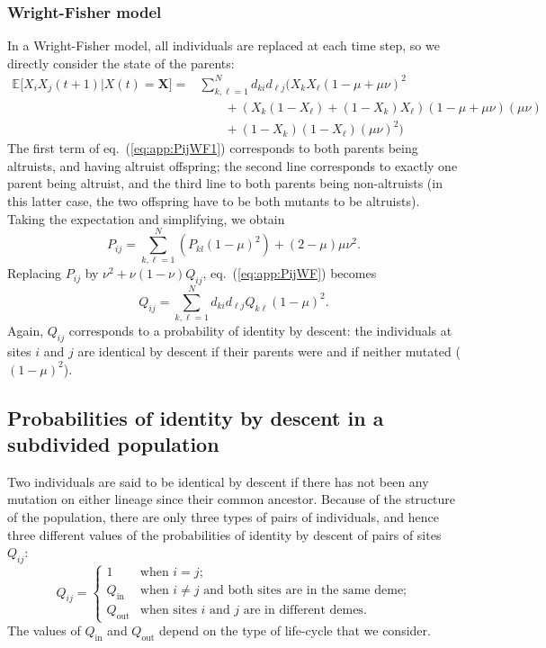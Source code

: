 \documentclass[11pt, letterpaper]{article}
\renewcommand{\eqref}[1]{\textup{{\normalfont eq.~(\ref{#1}}\normalfont)}}
\newcommand{\Esp}[1]{\mathbb{E}\big[ #1\big]}%
\newcommand{\mutbias}{\nu}
\newcommand{\inn}{\textrm{in}}
\newcommand{\out}{\textrm{out}}
\newcommand{\Qin}{Q_{\inn}}
\newcommand{\Qout}{Q_{\out}}
\begin{document}
\subsubsection{Wright-Fisher model}

In a Wright-Fisher model, all individuals are replaced at each time step, so we directly consider the state of the parents:
\begin{align}\label{eq:app:PijWF1}
 \Esp{X_iX_j(t+1)|X(t)=\mathbf{X}} = & \sum_{k, \ell = 1}^N  d_{ki} d_{\ell j} \Bigg( X_k X_{\ell} (1-\mu+\mu \mutbias)^2 \nonumber\\ & \qquad + \left( X_k (1-X_{\ell}) + (1-X_k) X_{\ell} \right) (1-\mu+\mu \mutbias) (\mu \mutbias) \nonumber\\
 & \qquad + (1-X_k)(1-X_{\ell}) (\mu \mutbias)^2 \Bigg)
\end{align}
The first term of \eqref{eq:app:PijWF1} corresponds to both parents being altruists, and having altruist offspring; the second line corresponds to exactly one parent being altruist, and the third line to both parents being non-altruists (in this latter case, the two offspring have to be both mutants to be altruists). \\
Taking the expectation and simplifying, we obtain
\begin{equation}\label{eq:app:PijWF}
P_{ij} = \sum_{k, \ell = 1}^N \left( P_{kl} (1-\mu)^2  \right)+ (2-\mu)\mu \mutbias^2. 
\end{equation}
Replacing $P_{ij}$ by $\mutbias^2 + \mutbias (1-\mutbias) Q_{ij}$, \eqref{eq:app:PijWF} becomes
\begin{equation}\label{eq:app:QijWF}
Q_{ij} = \sum_{k, \ell=1}^N d_{ki} d_{\ell j} Q_{k\ell} (1-\mu)^2. 
\end{equation}
Again, $Q_{ij}$ corresponds to a probability of identity by descent: the individuals at sites $i$ and $j$ are identical by descent if their parents were and if neither mutated ($(1-\mu)^2$). 

\clearpage
\subsection{\label{sec:app:Qsubdiv}Probabilities of identity by descent in a subdivided population}
Two individuals are said to be identical by descent if there has not been any mutation on either lineage since their common ancestor. Because of the structure of the population, there are only three types of pairs of individuals, and hence three different values of the probabilities of identity by descent of pairs of sites $Q_{ij}$:
\begin{equation}
Q_{ij} = 
\begin{cases}
1 & \textrm{when $i=j$;}\\
%
\Qin & \textrm{when $i\neq j$ and both sites are in the same deme;}\\
%
\Qout & \textrm{when sites $i$ and $j$ are in different demes.}
\end{cases}
\end{equation}
The values of $\Qin$ and $\Qout$ depend on the type of life-cycle that we consider. 
\end{document}

